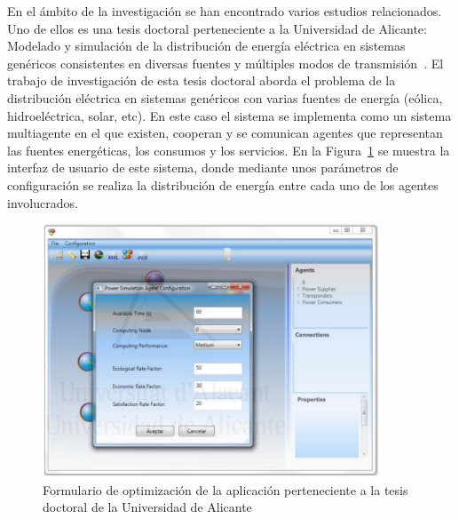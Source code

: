 En el ámbito de la investigación se han encontrado varios estudios relacionados. Uno de ellos es una tesis doctoral perteneciente a la Universidad de Alicante: Modelado y simulación de la distribución de energía eléctrica en sistemas genéricos consistentes en diversas fuentes y múltiples modos de transmisión~\cite{Valdi13}. El trabajo de investigación de esta tesis doctoral aborda el problema de la distribución eléctrica en sistemas genéricos con varias fuentes de energía (eólica, hidroeléctrica, solar, etc). En este caso el sistema se implementa como un sistema multiagente en el que existen, cooperan y se comunican agentes que representan las fuentes energéticas, los consumos y los servicios. En la Figura~\ref{fig:tesis} se muestra la interfaz de usuario de este sistema, donde mediante unos parámetros de configuración se realiza la distribución de energía entre cada uno de los agentes involucrados.\\
\begin{figure}[H]
	\centering
	\includegraphics[width=10cm]{figs/tesis.png}
	\caption{Formulario de optimización de la aplicación perteneciente a la tesis doctoral de la Universidad de Alicante}
        \label{fig:tesis}
\end{figure}

